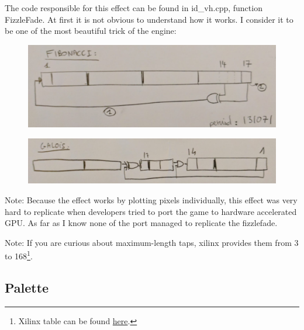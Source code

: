 The code responsible for this effect can be found in id\_vh.cpp, function FizzleFade. At first it is not obvious to understand how it works. I consider it to be one of the most beautiful trick of the engine:\\
\par
\begin{minipage}{\textwidth}

\end{minipage}
\par
        
\begin{figure}[H] \centering \includegraphics[width=\textwidth]{imgs/fizzlefade/fibonnaci.png} \end{figure}
\begin{figure}[H] \centering \includegraphics[width=\textwidth]{imgs/fizzlefade/galois.png} \end{figure}
      
Note: Because the effect works by plotting pixels individually, this effect was very hard to replicate when developers tried to port the game to hardware accelerated GPU. As far as I know none of the port managed to replicate the fizzlefade.

Note: If you are curious about maximum-length taps, xilinx provides them from 3 to 168\footnote{Xilinx table can be found \href{http://www.xilinx.com/support/documentation/application\_notes/xapp052.pdf}{here}.}.










\subsection{Palette}

